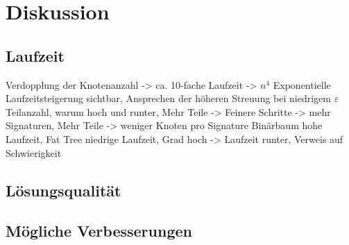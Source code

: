 
\chapter{Diskussion}\label{chapter:diskussion}
\section{Laufzeit}
Verdopplung der Knotenanzahl -> ca. 10-fache Laufzeit -> $n^4$
Exponentielle Laufzeitsteigerung sichtbar, Ansprechen der höheren Streuung bei niedrigem $\varepsilon$
Teilanzahl, warum hoch und runter, Mehr Teile -> Feinere Schritte -> mehr Signaturen, Mehr Teile -> weniger Knoten pro Signature
Binärbaum hohe Laufzeit, Fat Tree niedrige Laufzeit, Grad hoch -> Laufzeit runter, Verweis auf Schwierigkeit

\section{Lösungsqualität}
\section{Mögliche Verbesserungen}

